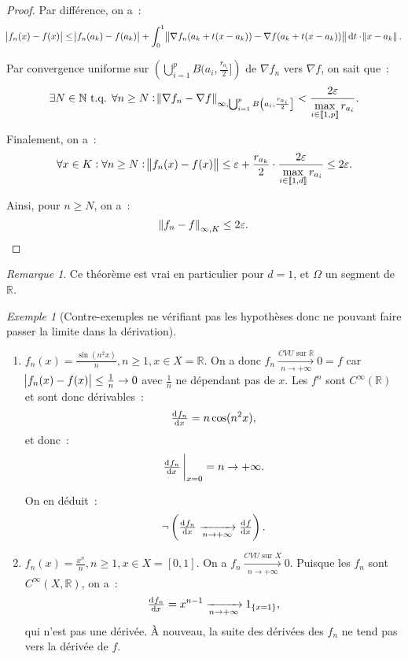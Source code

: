\documentclass{report}
\theoremstyle{definition}
\theoremstyle{remark}
\newtheorem*{rmq}{Remarque}
\newtheorem{ex}{Exemple}[chapter]
\newcommand{\R}{\mathbb R}
\newcommand{\N}{\mathbb N}
\newcommand{\tq}{\text{ t.q. }}
\newcommand{\CONV}[5]{\xrightarrow[#2 \to #3]{#4 \text{ #5 } #1}}
\newcommand{\CVU}[3]{\CONV{#1}{#2}{#3}{CVU}{sur}}
\newcommand{\intint}[2]{\left\llbracket#1, #2\right\rrbracket}
\newcommand{\pinfty}{{+\infty}}
\begin{document}
\begin{proof}
			Par différence, on a~:
			\[\abs {f_n(x) - f(x)} \leq \abs {f_n(a_k) - f(a_k)} + \int_0^1\norm {\nabla f_n(a_k + t(x - a_k))
				- \nabla f(a_k + t(x - a_k))}\dif t \cdot \norm {x - a_k}.\]

			Par convergence uniforme sur $\left(\bigcup_{i=1}^pB(a_i, \frac {r_{a_i}}2]\right)$ de $\nabla f_n$ vers $\nabla f$, on sait que~:
			\[\exists N \in \N \tq \forall n \geq N : \norm {\nabla f_n - \nabla f}_{\infty, \bigcup_{i=1}^pB\left(a_i, \frac {r_{a_i}}2\right]} <
				\frac {2\varepsilon}{\displaystyle \max_{i \in \intint 1p} r_{a_i}}.\]

			Finalement, on a~:
			\[\forall x \in K : \forall n \geq N : \norm {f_n(x) - f(x)} \leq
				\varepsilon + \frac {r_{a_k}}{2} \cdot \frac {2\varepsilon}{\displaystyle \max_{i \in \intint 1d}r_{a_i}} \leq 2\varepsilon.\]

			Ainsi, pour $n \geq N$, on a~:
			\[\norm {f_n - f}_{\infty, K} \leq 2\varepsilon.\]
			\end{proof}

			\begin{rmq} Ce théorème est vrai en particulier pour $d = 1$, et $\Omega$ un segment de $\R$. \end{rmq}

			\begin{ex}[Contre-exemples ne vérifiant pas les hypothèses donc ne pouvant faire passer la limite dans la dérivation]
			\begin{enumerate}
				\item $f_n(x) = \frac {\sin(n^2x)}n, n \geq 1, x \in X = \R$. On a donc $f_n \CVU \R n\pinfty 0 = f$ car $\abs {f_n(x) - f(x)} \leq \frac 1n \to 0$
				      avec $\frac 1n$ ne dépendant pas de $x$. Les $f^n$ sont $C^\infty(\R)$ et sont donc dérivables~:
				      \[\od {f_n}x = n\cos(n^2x),\]
				      et donc~:
				      \[\od {f_n}x\sVert[3]_{x=0} = n \to \pinfty.\]

			          On en déduit~:
				      \[\lnot\left(\od {f_n}x \xrightarrow[n \to \pinfty]{} \od fx\right).\]

				\item $f_n(x) = \frac {x^n}n, n \geq 1, x \in X = [0, 1]$. On a $f_n \CVU Xn\pinfty 0$. Puisque les $f_n$ sont $C^\infty(X, \R)$, on a~:
				      \[\od {f_n}x = x^{n-1} \xrightarrow[n \to \pinfty]{} 1_{\{x=1\}},\]
				      qui n'est pas une dérivée. À nouveau, la suite des dérivées des $f_n$ ne tend pas vers la dérivée de $f$.
			\end{enumerate}
			\end{ex}
\end{document}
